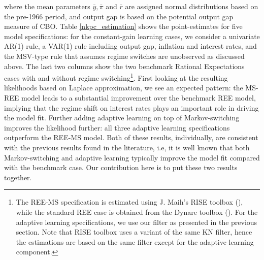 \documentclass[12pt,reqno]{article}
\numberwithin{equation}{section}
\begin{document}
where the mean parameters $\bar{y}, \bar{\pi} $ and $\bar{r}$ are assigned normal distributions based on the pre-1966 period, and output gap is based on the potential output gap measure of CBO.  Table \ref{nkpc_estimation} shows the point-estimates for five model specifications: for the constant-gain learning cases, we consider a univariate AR(1) rule, a VAR(1) rule including output gap, inflation and interest rates, and the MSV-type rule that assumes regime switches are unobserved as discussed above. The last two columns show the two benchmark Rational Expectations cases with and without regime switching\footnote{The REE-MS specification is estimated using J. Maih's RISE toolbox (\cite{maih2015efficient}), while the standard REE case is obtained from the Dynare toolbox (\cite{adjemian2011dynare}). For the adaptive learning specifications, we use our filter as presented in the previous section. Note that RISE toolbox uses a variant of the same KN filter, hence the estimations are based on the same filter except for the adaptive learning component.}. First looking at the resulting likelihoods based on Laplace approximation, we see an expected pattern: the MS-REE model leads to a substantial improvement over the benchmark REE model, implying that the regime shift on interest rates plays an important role in driving the model fit. Further adding adaptive learning on top of Markov-switching improves the likelihood further: all three adaptive learning specifications outperform the REE-MS model. Both of these results, individually, are consistent with the previous results found in the literature, i.e, it is well known that both Markov-switching and adaptive learning typically improve the model fit compared with the benchmark case. Our contribution here is to put these two results together.\\
\end{document}

